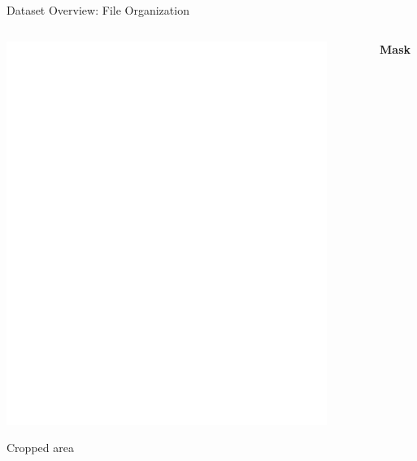 \documentclass[8pt,aspectratio=169,xcolor=dvipsnames]{beamer}
\begin{document}
\begin{frame}{Dataset Overview: File Organization}
\begin{columns}
\begin{column}{0.3\textwidth}
            \includegraphics[width=0.9\textwidth]{ddsmmask.png}
            
            \small
            Cropped area
            
        \end{column}
        
        \begin{column}{0.3\textwidth}
            \centering
            \textbf{Mask}
            \vspace{0.2cm}
            

\end{column}
\end{columns}
\end{frame}
\end{document}
